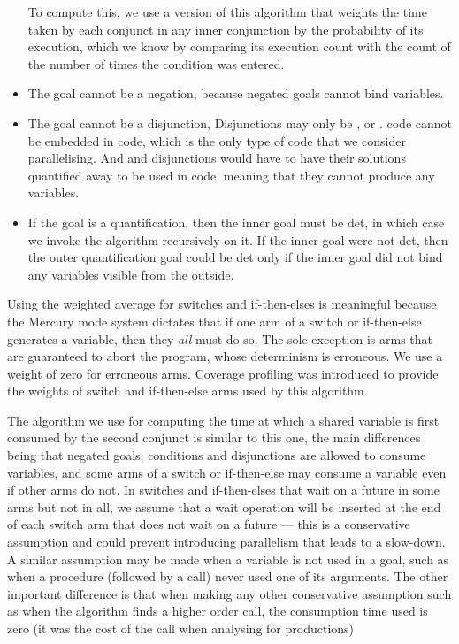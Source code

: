 \begin{itemize}
To compute this, we use a version of this algorithm
that weights the time taken by each conjunct in any inner conjunction
by the probability of its execution,
which we know by comparing its execution count
with the count of the number of times the condition was entered.
\item
The goal cannot be a negation, because negated goals cannot bind variables.
\item
The goal cannot be a disjunction,
Disjunctions may only be {\dsemidet}, \dmulti or {\dnondet}.
\dsemidet code cannot be embedded in \ddet code,
which is the only type of code that we consider parallelising.
And \dmulti and \dnondet disjunctions would have to have their solutions
quantified away to be used in \ddet code,
meaning that they cannot produce any variables.
\item
If the goal is a quantification,
then the inner goal must be det,
in which case we invoke the algorithm recursively on it.
If the inner goal were not det,
then the outer quantification goal could be det
only if the inner goal did not bind any variables visible from the outside.
\end{itemize}

\noindent
Using the weighted average for switches and if-then-elses is meaningful because
the Mercury mode system dictates
that if one arm of a switch or if-then-else generates a variable,
then they \emph{all} must do so.
The sole exception is arms that are guaranteed to abort the program,
whose determinism is erroneous.
We use a weight of zero for erroneous arms.
Coverage profiling was introduced to provide the weights of switch and
if-then-else arms used by this algorithm.

The algorithm we use for computing the time
at which a shared variable is first consumed by the second conjunct
is similar to this one,
the main differences being that
negated goals, conditions and disjunctions are allowed to consume variables,
and some arms of a switch or if-then-else
may consume a variable even if other arms do not.
In switches and if-then-elses that wait on a future in some arms but
not in all,
we assume that a wait operation will be inserted at the end of each
switch arm that does not wait on a future ---
this is a conservative assumption and could prevent introducing
parallelism that leads to a slow-down.
A similar assumption may be made when a variable is not used in a goal,
such as when a procedure (followed by a call) never used one of its
arguments.
The other important difference is that when making 
any other conservative assumption 
such as when the algorithm finds a higher order call,
the consumption time used is zero
(it was the cost of the call when analysing for productions) 

